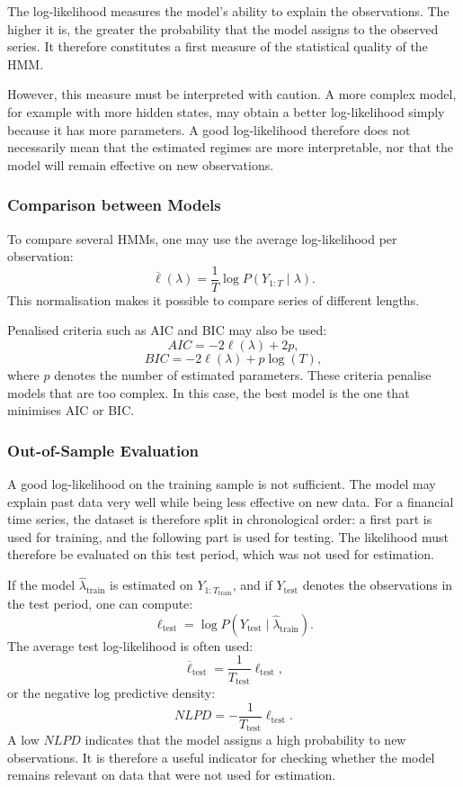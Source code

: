 \documentclass[11pt]{article}
\begin{document}
The log-likelihood measures the model's ability to explain the observations. The higher it is, the greater the probability that the model assigns to the observed series. It therefore constitutes a first measure of the statistical quality of the HMM.

However, this measure must be interpreted with caution. A more complex model, for example with more hidden states, may obtain a better log-likelihood simply because it has more parameters. A good log-likelihood therefore does not necessarily mean that the estimated regimes are more interpretable, nor that the model will remain effective on new observations.

\subsubsection{Comparison between Models}

To compare several HMMs, one may use the average log-likelihood per observation:
\[
\overline{\ell}(\lambda)
=
\frac{1}{T}\log P(Y_{1:T}\mid \lambda).
\]
This normalisation makes it possible to compare series of different lengths.

Penalised criteria such as AIC and BIC may also be used:
\[
AIC = -2\ell(\lambda)+2p,
\]
\[
BIC = -2\ell(\lambda)+p\log(T),
\]
where \(p\) denotes the number of estimated parameters. These criteria penalise models that are too complex. In this case, the best model is the one that minimises AIC or BIC.

\subsubsection{Out-of-Sample Evaluation}

A good log-likelihood on the training sample is not sufficient. The model may explain past data very well while being less effective on new data. For a financial time series, the dataset is therefore split in chronological order: a first part is used for training, and the following part is used for testing. The likelihood must therefore be evaluated on this test period, which was not used for estimation.

If the model \(\widehat{\lambda}_{\text{train}}\) is estimated on \(Y_{1:T_{\text{train}}}\), and if \(Y_{\text{test}}\) denotes the observations in the test period, one can compute:
\[
\ell_{\text{test}}
=
\log P(Y_{\text{test}}\mid \widehat{\lambda}_{\text{train}}).
\]
The average test log-likelihood is often used:
\[
\overline{\ell}_{\text{test}}
=
\frac{1}{T_{\text{test}}}\ell_{\text{test}},
\]
or the negative log predictive density:
\[
NLPD
=
-\frac{1}{T_{\text{test}}}\ell_{\text{test}}.
\]
A low \(NLPD\) indicates that the model assigns a high probability to new observations. It is therefore a useful indicator for checking whether the model remains relevant on data that were not used for estimation.
\end{document}
